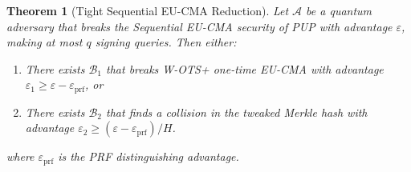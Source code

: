 \documentclass[11pt]{article}
\newtheorem{theorem}{Theorem}
\begin{document}
\begin{theorem}[Tight Sequential EU-CMA Reduction]\label{thm:eucma}
Let $\mathcal{A}$ be a quantum adversary that breaks the Sequential
EU-CMA security of PUP with advantage $\varepsilon$, making at most
$q$ signing queries. Then either:
\begin{enumerate}
\item[(a)] There exists $\mathcal{B}_1$ that breaks W-OTS+ one-time
EU-CMA with advantage $\varepsilon_1 \geq \varepsilon - \varepsilon_{\mathrm{prf}}$, or
\item[(b)] There exists $\mathcal{B}_2$ that finds a collision in the
tweaked Merkle hash with advantage $\varepsilon_2 \geq (\varepsilon - \varepsilon_{\mathrm{prf}}) / H$.
\end{enumerate}
where $\varepsilon_{\mathrm{prf}}$ is the PRF distinguishing advantage.
\end{theorem}
\end{document}
